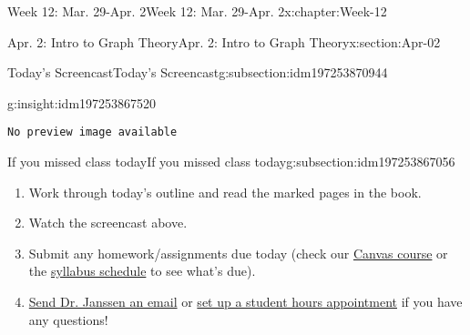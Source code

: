 \documentclass[oneside,10pt,]{book}
\newcommand{\mono}[1]{\texttt{#1}}
\numberwithin{equation}{section}
\newlength{\qrsize}
\newlength{\previewwidth}
\begin{document}
\begin{chapterptx}{Week 12: Mar. 29-Apr. 2}{}{Week 12: Mar. 29-Apr. 2}{}{}{x:chapter:Week-12}
\begin{sectionptx}{Apr. 2: Intro to Graph Theory}{}{Apr. 2: Intro to Graph Theory}{}{}{x:section:Apr-02}
%
%
\typeout{************************************************}
\typeout{************************************************}
%
\begin{subsectionptx}{Today's Screencast}{}{Today's Screencast}{}{}{g:subsection:idm197253870944}
\begin{insight}{}{g:insight:idm197253867520}%
\setlength{\qrsize}{9em}
\setlength{\previewwidth}{\linewidth}
\addtolength{\previewwidth}{-\qrsize}
\begin{tcbraster}[raster columns=2, raster column skip=1pt, raster halign=center, raster force size=false, raster left skip=0pt, raster right skip=0pt]%
\begin{tcolorbox}[previewstyle, width=\previewwidth]%
\mono{No preview image available}%
\end{tcolorbox}%
\begin{tcolorbox}[qrstyle]%
[QR LINK]\end{tcolorbox}%
\end{tcbraster}%
\end{insight}
\end{subsectionptx}
%
%
\typeout{************************************************}
\typeout{************************************************}
%
\begin{subsectionptx}{If you missed class today}{}{If you missed class today}{}{}{g:subsection:idm197253867056}
%
\begin{enumerate}
\item{}Work through today's outline and read the marked pages in the book.%
\item{}Watch the screencast above.%
\item{}Submit any homework\slash{}assignments due today (check our \href{https://dordt.instructure.com/courses/3110050}{Canvas course} or the \href{https://prof.mkjanssen.org/ds/index.html\#schedule}{syllabus schedule} to see what's due).%
\item{}\href{mailto:mike.janssen@dordt.edu}{Send Dr. Janssen an email} or \href{https://calendly.com/mkjanssen/student-hours}{set up a student hours appointment} if you have any questions!%
\end{enumerate}
\end{subsectionptx}
\end{sectionptx}
\end{chapterptx}
%
%
\typeout{************************************************}
\end{document}
